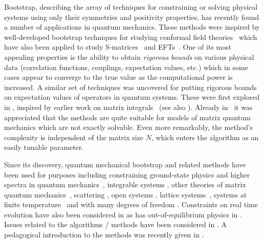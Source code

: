 \documentclass[a4paper,11pt]{article}
\numberwithin{equation}{section}
\begin{document}
Bootstrap, describing the array of techniques for constraining or solving physical systems using only their symmetries and positivity properties, has recently found a number of applications in quantum mechanics. These methods were inspired by well-developed bootstrap techniques for studying conformal field theories~\cite{Belavin:1984vu, Rattazzi:2008pe,Kos:2016ysd,Simmons-Duffin:2015qma, Poland:2018epd} which have also been applied to study S-matrices~\cite{Paulos:2016but, Paulos:2016fap, Paulos:2017fhb} and EFTs~\cite{Caron-Huot:2020cmc,Tolley:2020gtv, Sinha:2020win, Arkani-Hamed:2020blm}. One of its most appealing properties is the ability to obtain \textit{rigorous bounds} on various physical data (correlation functions, couplings, expectation values, etc.) which in some cases appear to converge to the true value as the computational power is increased. A similar set of techniques was uncovered for putting rigorous bounds on expectation values of operators in quantum systems. These were first explored in \cite{Han:2020bkb}, inspired by earlier work on matrix integrals~\cite{Lin:2020mme} (see also \cite{Koch:2021yeb,Kazakov:2021lel}). Already in~\cite{Han:2020bkb} it was appreciated that the methods are quite suitable for models of matrix quantum mechanics which are not exactly solvable. Even more remarkably, the method's complexity is independent of the matrix size $N$, which enters the algorithm as an easily tunable parameter.

Since its discovery, quantum mechanical bootstrap and related methods have been used for purposes including constraining ground-state physics and higher spectra in quantum mechanics~\cite{Berenstein:2021dyf,Berenstein:2021loy,Nancarrow:2022wdr,Aikawa:2021eai,Tchoumakov:2021mnh,Aikawa:2021qbl,Du:2021hfw,Bai:2022yfv,Hu:2022keu,Berenstein:2022ygg,Guo:2023gfi,Blacker:2022szo,Sword:2024gvv,Huang:2025sua, Lin:2025srf}, integrable systems \cite{Aikawa:2025dvt}, other theories of matrix quantum mechanics~\cite{Lin:2023owt,Lin:2024vvg}, scattering \cite{Berenstein:2023ppj}, open systems \cite{Robichon:2024apx}, lattice systems~\cite{PhysRevLett.108.200404,Anderson:2016rcw,Lawrence:2021msm,Lawrence:2022vsb,Kazakov:2022xuh,Cho:2022lcj, Cho:2023ulr, Kazakov:2024ool, Li:2024wrd,Guo:2025fii}, systems at finite temperature~\cite{Fawzi:2023fpg,Cho:2024kxn} and with many degrees of freedom \cite{Kull:2022wof,Wang:2023hss, Cho:2024owx, Scheer:2024eyu,Berenstein:2024ebf,Jansen:2025nlc, Gao2025}. Constraints on real time evolution have also been considered in \cite{Lawrence:2024hjm, Lawrence:2024mnj} as has out-of-equilibrium physics in \cite{Cho:2025dgc, Cho:2025nlv}. Issues related to the algorithms / methods have been considered in \cite{Berenstein:2022unr,Berenstein:2025itw}. A pedagogical introduction to the methods was recently given in \cite{Lin:2025iir}.
\end{document}
